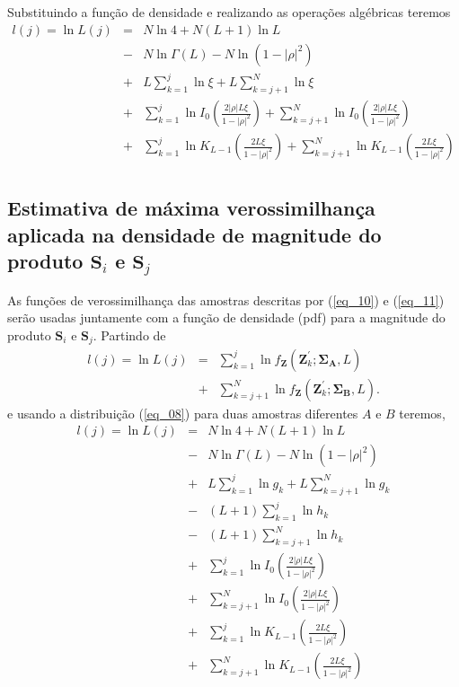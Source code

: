 Substituindo a função de densidade e realizando as operações algébricas teremos
\begin{equation}
\begin{array}{rcl}
	l(j)=\ln L(j)&=&N\ln 4+N(L+1)\ln L\\
	             &-&N\ln\Gamma(L)-N\ln(1-|\rho|^2)\\
	             &+&L\sum_{k=1}^{j}\ln\xi +L\sum_{k=j+1}^{N}\ln\xi \\
	             &+&\sum_{k=1}^{j}\ln I_0\left(\frac{2|\rho|L\xi}{1-|\rho|^2}\right) +\sum_{k=j+1}^{N} \ln I_0\left(\frac{2|\rho|L\xi}{1-|\rho|^2}\right)        \\
	             &+&\sum_{k=1}^{j}\ln K_{L-1}\left(\frac{2L\xi}{1-|\rho|^2}\right) +\sum_{k=j+1}^{N} \ln K_{L-1}\left(\frac{2L\xi}{1-|\rho|^2}\right)         \\
\end{array}
\end{equation}


\subsection{Estimativa de máxima verossimilhança aplicada na densidade de magnitude do produto $\mathbf{S}_i$ e $\mathbf{S}_j$}
As funções de verossimilhança das amostras descritas por (\ref{eq_10}) e (\ref{eq_11}) serão usadas juntamente com a função de densidade (pdf) para a magnitude do produto $\mathbf{S}_i$ e $\mathbf{S}_j$. Partindo de 
\begin{equation*}
\begin{array}{rcl}
	l(j)=\ln L(j)&=&\sum_{k=1}^{j}\ln f_{\mathbf{Z}}(\mathbf{Z}_{k}^{'};\mathbf{\Sigma_{A}},L)\\
	             &+&\sum_{k=j+1}^{N}\ln f_{\mathbf{Z}}(\mathbf{Z}_{k}^{'};\mathbf{\Sigma_{B}},L).
\end{array}
\end{equation*}
e usando a distribuição (\ref{eq_08}) para duas amostras diferentes $A$ e $B$ teremos,
\begin{equation}
\begin{array}{rcl}
	l(j)=\ln L(j)&=&N\ln 4+N(L+1)\ln L\\
	             &-&N\ln\Gamma(L)-N\ln(1-|\rho|^2)\\
	             &+&L\sum_{k=1}^{j}\ln g_k+L\sum_{k=j+1}^{N}\ln g_k \\
	             &-&(L+1)\sum_{k=1}^{j}\ln h_k\\
	             &-&(L+1)\sum_{k=j+1}^{N}\ln h_k \\
	             &+&\sum_{k=1}^{j}\ln I_0\left(\frac{2|\rho|L\xi}{1-|\rho|^2}\right)\\ 
	             &+&\sum_{k=j+1}^{N} \ln I_0\left(\frac{2|\rho|L\xi}{1-|\rho|^2}\right)\\
	             &+&\sum_{k=1}^{j}\ln K_{L-1}\left(\frac{2L\xi}{1-|\rho|^2}\right)\\
	             &+&\sum_{k=j+1}^{N}\ln K_{L-1}\left(\frac{2L\xi}{1-|\rho|^2}\right)\\
	             
\end{array}
\end{equation}
